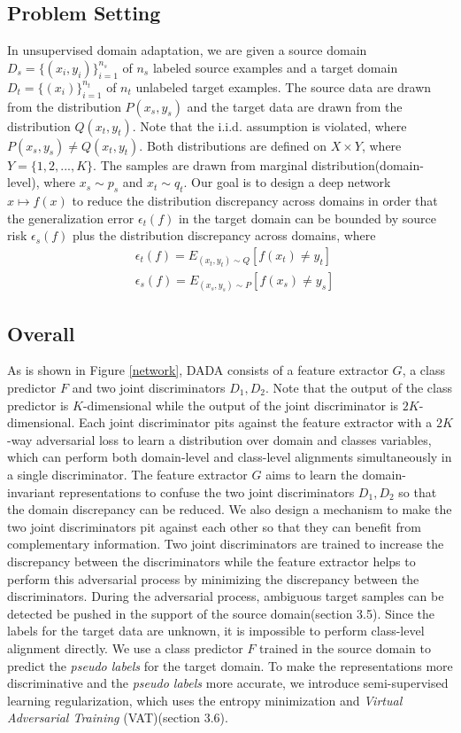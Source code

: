 \documentclass{ecai}
\begin{document}
\subsection{Problem Setting}
In unsupervised domain adaptation, we are given a source domain $D_s = \{(x_i,y_i)\}_{i=1}^{n_s}$ of $n_s$ labeled source examples and a target domain $D_t = \{(x_i)\}_{i=1}^{n_t}$ of $n_t$ unlabeled target examples. The source data are drawn from the distribution $P(x_s,y_s)$ and the target data are drawn from the distribution $Q(x_t,y_t)$. Note that the i.i.d. assumption is violated, where $P(x_s,y_s) \neq Q(x_t,y_t)$. Both distributions are defined on $X \times Y$, where $Y=\{1,2,...,K\}$.
  The samples are drawn from marginal distribution(domain-level), where $x_s \sim p_s$ and $x_t \sim q_t$. Our goal is to design a deep network $x\mapsto f(x)$ to reduce the distribution discrepancy across domains in order that the generalization error $\epsilon_t(f)$ in the target domain can be bounded by source risk $\epsilon_s(f)$ plus
   the distribution discrepancy across domains\cite{b3}, where
\begin{align}
& \epsilon_t(f) = E_{(x_t,y_t) \sim Q} [f(x_t) \neq y_t] \\
& \epsilon_s(f) = E_{(x_s,y_s)\sim P} [f(x_s)\neq y_s]
\end{align}




\subsection{Overall}

As is shown in Figure \ref{network}, DADA consists of a feature extractor $G$, a class predictor $F$ and
 two joint discriminators $D_1, D_2$. Note that the output of the class predictor is $K$-dimensional
  while the output of the joint discriminator is $2K$-dimensional. Each joint discriminator pits against the feature extractor with a $2K$-way adversarial loss to learn a distribution over domain and classes variables, which can perform both domain-level and class-level alignments simultaneously in a single discriminator.
  The feature extractor $G$ aims to learn the domain-invariant representations to confuse the two joint discriminators $D_1, D_2$ so that the domain discrepancy can be reduced. We also design a mechanism to make the two joint discriminators pit against each other so that they can benefit from complementary information. Two joint discriminators are trained to increase the discrepancy between the discriminators while the feature extractor helps to perform this adversarial process by minimizing the discrepancy between the discriminators. During the adversarial process, ambiguous target samples can be detected  be pushed in the support of the source domain(section 3.5). Since the labels for the target data are unknown, it is impossible to perform class-level alignment directly. We use a class predictor $F$ trained in the source domain to predict the {\emph{pseudo labels}} for the target domain. To make the representations more discriminative and the {\emph{pseudo labels}} more accurate, we introduce semi-supervised learning  regularization, which uses the entropy minimization and {\emph{Virtual Adversarial Training}} (VAT)(section 3.6).
\end{document}
